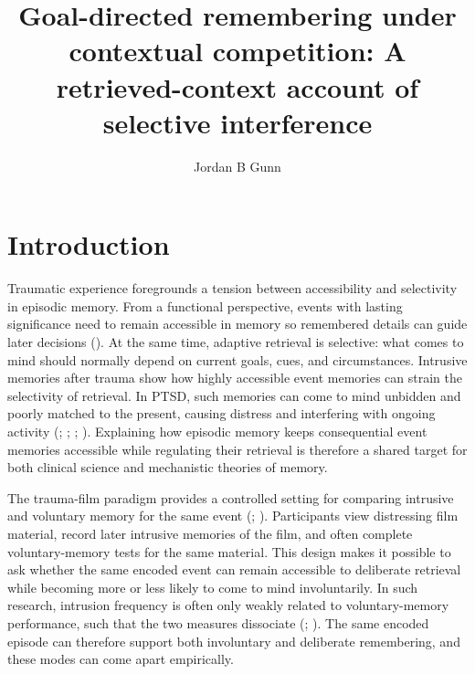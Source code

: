 \documentclass[
  man,
  floatsintext,
  longtable,
  nolmodern,
  notxfonts,
  notimes,
  draftfirst,
  colorlinks=true,linkcolor=blue,citecolor=blue,urlcolor=blue]{apa7}
\title{Goal-directed remembering under contextual competition: A
retrieved-context account of selective interference}
\author{Jordan B Gunn}
\affiliation{
{Department of Psychology, University of Cambridge}}
\begin{document}
\maketitle


\setcounter{secnumdepth}{-\maxdimen} %

\setlength\LTleft{0pt}


\section{Introduction}\label{introduction}

Traumatic experience foregrounds a tension between accessibility and
selectivity in episodic memory. From a functional perspective, events
with lasting significance need to remain accessible in memory so
remembered details can guide later decisions
(). At the same time,
adaptive retrieval is selective: what comes to mind should normally
depend on current goals, cues, and circumstances. Intrusive memories
after trauma show how highly accessible event memories can strain the
selectivity of retrieval. In PTSD, such memories can come to mind
unbidden and poorly matched to the present, causing distress and
interfering with ongoing activity
(;
;
;
). Explaining how
episodic memory keeps consequential event memories accessible while
regulating their retrieval is therefore a shared target for both
clinical science and mechanistic theories of memory.

The trauma-film paradigm provides a controlled setting for comparing
intrusive and voluntary memory for the same event
(;
). Participants view
distressing film material, record later intrusive memories of the film,
and often complete voluntary-memory tests for the same material. This
design makes it possible to ask whether the same encoded event can
remain accessible to deliberate retrieval while becoming more or less
likely to come to mind involuntarily. In such research, intrusion
frequency is often only weakly related to voluntary-memory performance,
such that the two measures dissociate
(;
). The same encoded
episode can therefore support both involuntary and deliberate
remembering, and these modes can come apart empirically.
\end{document}
